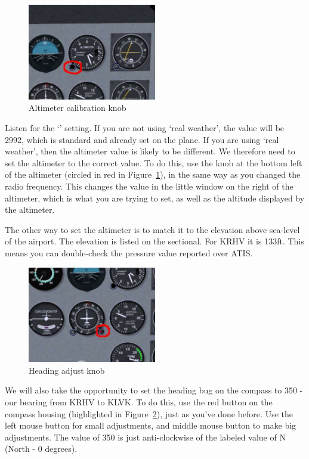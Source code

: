 \begin{figure}[!htp]
\centering
\includegraphics[width=0.5\textwidth]{altimeter}
\caption{Altimeter calibration knob\label{altimeter}}
\end{figure}

Listen for the `' setting. If you are not using `real weather',
the value will be 2992, which is standard and already set on the plane.
If you are using `real weather', then the altimeter value is likely to be different.
We therefore need to set the altimeter to the correct value.
To do this, use the knob at the bottom left of the altimeter
(circled in red in Figure~\ref{altimeter}), in the same way as
you changed the radio frequency. This changes the value in the
little window on the right of the altimeter, which is what you are
trying to set, as well as the altitude displayed by the altimeter.

The other way to set the altimeter is to match it to the elevation above
sea-level of the airport. The elevation is listed on the sectional.
For KRHV it is 133ft. This means you can double-check the pressure value reported over ATIS.

\begin{figure}[!htp]
\centering
\includegraphics[width=0.5\textwidth]{compass}
\caption{Heading adjust knob\label{head}}
\end{figure}

We will also take the opportunity to set the heading bug on the compass to 350 -
our bearing from KRHV to KLVK. To do this, use the red button on the compass
housing (highlighted in Figure~\ref{head}), just as you've done before.
Use the left mouse button for small adjustments, and middle mouse button
to make big adjustments. The value of 350 is just anti-clockwise of the
labeled value of N (North - 0 degrees).

